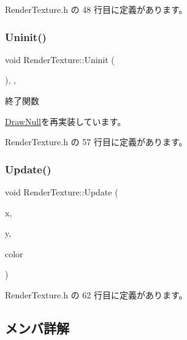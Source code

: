  Render\+Texture.\+h の 48 行目に定義があります。

\mbox{\label{class_render_texture_a0e55cd9b412d87dfe1f4b90f29f357c8}} 
\subsubsection{\texorpdfstring{Uninit()}{Uninit()}}
{\footnotesize\ttfamily void Render\+Texture\+::\+Uninit (\begin{DoxyParamCaption}{ }\end{DoxyParamCaption})\hspace{0.3cm}{\ttfamily [inline]}, {\ttfamily [override]}, {\ttfamily [virtual]}}



終了関数 



\mbox{\hyperlink{class_draw_null_a12d44e341c7364b5ab9cdd661dc16187}{Draw\+Null}}を再実装しています。



 Render\+Texture.\+h の 57 行目に定義があります。

\mbox{\label{class_render_texture_ac27f8cfac7903dd502de61e22abfc457}} 
\subsubsection{\texorpdfstring{Update()}{Update()}}
{\footnotesize\ttfamily void Render\+Texture\+::\+Update (\begin{DoxyParamCaption}\item[{float}]{x,  }\item[{float}]{y,  }\item[{\mbox{\hyperlink{_vector3_d_8h_a680c30c4a07d86fe763c7e01169cd6cc}{X\+Color4}}}]{color }\end{DoxyParamCaption})\hspace{0.3cm}{\ttfamily [inline]}}



 Render\+Texture.\+h の 62 行目に定義があります。



\subsection{メンバ詳解}
\mbox{\label{class_render_texture_ad354ed8b9968b5741feb43775cc821b9}} 
